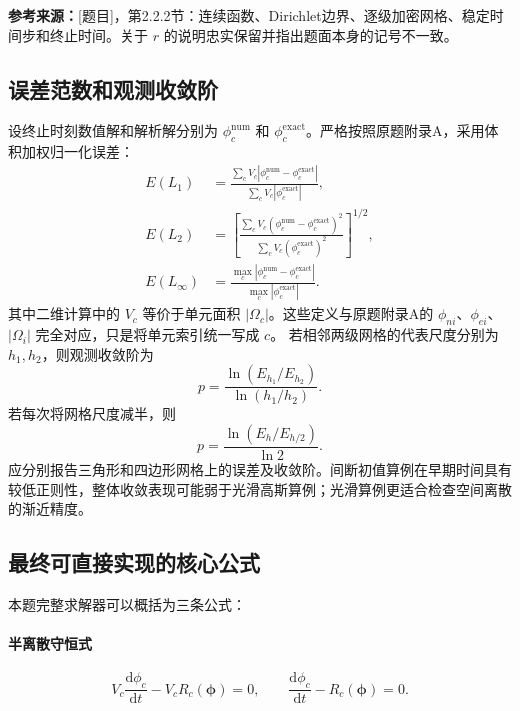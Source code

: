 \documentclass[UTF8,12pt,a4paper]{ctexart}
\numberwithin{equation}{section}
\newcommand{\Task}{\textnormal{[题目]}}
\newcommand{\source}[1]{%
  \par\smallskip
  \noindent\colorbox{sourcebg}{%
    \parbox{0.955\linewidth}{\raggedright\footnotesize\color{sourcegray}\textbf{参考来源：}#1}%
  }
  \par\smallskip
}
\begin{document}
\source{\Task，第2.2.2节：连续函数、Dirichlet边界、逐级加密网格、稳定时间步和终止时间。关于 $r$ 的说明忠实保留并指出题面本身的记号不一致。}

\subsection{误差范数和观测收敛阶}

设终止时刻数值解和解析解分别为 $\phi_c^{\mathrm{num}}$ 和
$\phi_c^{\mathrm{exact}}$。严格按照原题附录A，采用体积加权归一化误差：
\begin{align}
  E(L_1)
  &=\frac{\sum_cV_c
  |\phi_c^{\mathrm{num}}-\phi_c^{\mathrm{exact}}|}
  {\sum_cV_c|\phi_c^{\mathrm{exact}}|},
  \label{eq:L1_error}\\
  E(L_2)
  &=\left[
  \frac{\sum_cV_c
  (\phi_c^{\mathrm{num}}-\phi_c^{\mathrm{exact}})^2}
  {\sum_cV_c(\phi_c^{\mathrm{exact}})^2}
  \right]^{1/2},
  \label{eq:L2_error}\\
  E(L_\infty)
  &=\frac{
  \max_c|\phi_c^{\mathrm{num}}-\phi_c^{\mathrm{exact}}|}
  {\max_c|\phi_c^{\mathrm{exact}}|}.
  \label{eq:Linf_error}
\end{align}
其中二维计算中的 $V_c$ 等价于单元面积 $|\Omega_c|$。这些定义与原题附录A的
$\phi_{ni}$、$\phi_{ei}$、$|\Omega_i|$ 完全对应，只是将单元索引统一写成 $c$。
若相邻两级网格的代表尺度分别为 $h_1,h_2$，则观测收敛阶为
\begin{equation}
  \boxed{
  p=\frac{\ln(E_{h_1}/E_{h_2})}{\ln(h_1/h_2)}}.
  \label{eq:observed_order}
\end{equation}
若每次将网格尺度减半，则
\begin{equation}
  p=\frac{\ln(E_h/E_{h/2})}{\ln2}.
  \label{eq:order_halving}
\end{equation}
应分别报告三角形和四边形网格上的误差及收敛阶。间断初值算例在早期时间具有较低正则性，整体收敛表现可能弱于光滑高斯算例；光滑算例更适合检查空间离散的渐近精度。

\subsection{最终可直接实现的核心公式}

本题完整求解器可以概括为三条公式：

\paragraph{半离散守恒式}
\begin{equation}
  \boxed{
  V_c\frac{\mathrm d\phi_c}{\mathrm dt}
  -V_cR_c(\bm\phi)=0,
  \qquad
  \frac{\mathrm d\phi_c}{\mathrm dt}-R_c(\bm\phi)=0.}
  \label{eq:summary_semi}
\end{equation}
\end{document}
